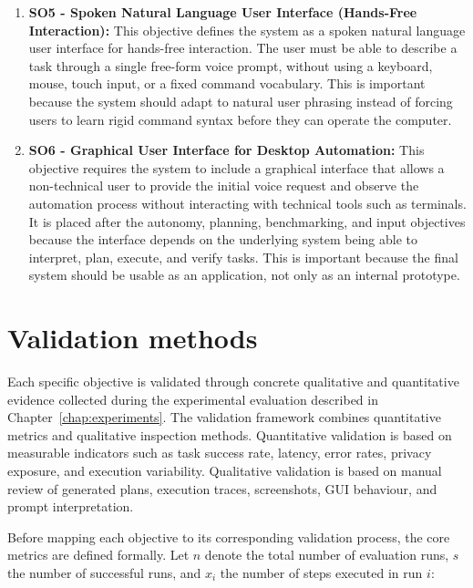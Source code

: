 \begin{enumerate}
    \item \label{so:5} \textbf{SO5 - Spoken Natural Language User Interface (Hands-Free Interaction):} This objective defines the system as a spoken natural language user interface for hands-free interaction. The user must be able to describe a task through a single free-form voice prompt, without using a keyboard, mouse, touch input, or a fixed command vocabulary. This is important because the system should adapt to natural user phrasing instead of forcing users to learn rigid command syntax before they can operate the computer.

    \item \label{so:6} \textbf{SO6 - Graphical User Interface for Desktop Automation:} This objective requires the system to include a graphical interface that allows a non-technical user to provide the initial voice request and observe the automation process without interacting with technical tools such as terminals. It is placed after the autonomy, planning, benchmarking, and input objectives because the interface depends on the underlying system being able to interpret, plan, execute, and verify tasks. This is important because the final system should be usable as an application, not only as an internal prototype.

\end{enumerate}

\section{Validation methods}
\label{sec:validation_methods}

Each specific objective is validated through concrete qualitative and quantitative evidence collected during the experimental evaluation described in Chapter~\ref{chap:experiments}. The validation framework combines quantitative metrics and qualitative inspection methods. Quantitative validation is based on measurable indicators such as task success rate, latency, error rates, privacy exposure, and execution variability. Qualitative validation is based on manual review of generated plans, execution traces, screenshots, GUI behaviour, and prompt interpretation.

Before mapping each objective to its corresponding validation process, the core metrics are defined formally. Let $n$ denote the total number of evaluation runs, $s$ the number of successful runs, and $x_i$ the number of steps executed in run $i$:

